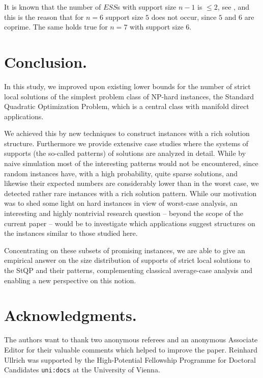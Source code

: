 \documentclass[moor]{informs3}              %
\def\coma#1{{#1}}
\begin{document}
It is known that the number of $ESS$s with support size $n-1$ is $\leq 2$, see \cite{Vick88a}, and this is the reason that for $n=6$ support size $5$ does not occur, since $5$ and $6$ are coprime. The same holds true for $n=7$ with support size $6$.


\section{Conclusion.}
In this study, we improved upon existing lower bounds for the number of strict local solutions of the simplest problem class of NP-hard instances, the Standard Quadratic Optimization Problem, which is a central class with manifold direct applications.

We achieved this by new techniques to construct instances with a rich solution structure. Furthermore we provide extensive case studies where the systems of supports (the so-called patterns) of solutions are analyzed in detail. While by naive simulation most of the interesting patterns would not be encountered, since random instances have, with a high probability, quite sparse solutions, and likewise their expected numbers are considerably lower than in the worst case, we detected rather rare instances with a rich solution pattern. \coma{While our motivation was to shed some light on hard instances in view of worst-case analysis, an interesting and highly nontrivial research question -- beyond the scope of the current paper -- would be to investigate which applications suggest structures on the instances similar to those studied here.}

Concentrating on these subsets of promising instances, we are able to give an empirical answer on the size distribution of supports of strict local solutions to the StQP and their patterns, complementing classical average-case analysis and enabling a new perspective on this notion.

\section*{Acknowledgments.}
The authors want to thank two anonymous referees and an anonymous Associate Editor for their valuable comments which helped to improve the paper. Reinhard Ullrich was supported by the High-Potential Fellowship Programme for Doctoral Candidates {\tt uni:docs} at the University of Vienna.




\end{document}
